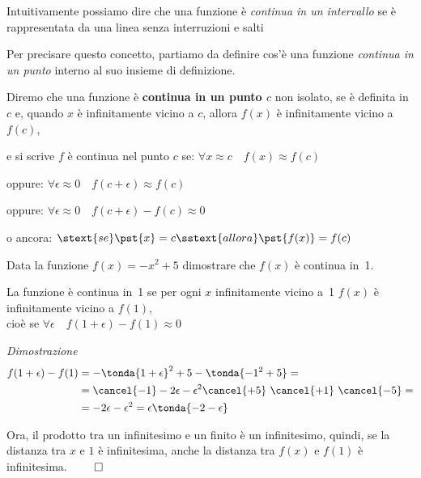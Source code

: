 Intuitivamente possiamo dire che una funzione è 
\emph{continua in un intervallo} 
se è rappresentata da una linea senza interruzioni e salti

Per precisare questo concetto, partiamo da definire cos'è una funzione 
\emph{continua in un punto} interno al suo insieme di definizione.

\begin{definizione}
Diremo che una funzione è \textbf{continua in un punto \(c\)} non isolato, 
se è definita in \(c\) e, 
quando \(x\) è infinitamente vicino a \(c\), 
allora \(f(x)\) è infinitamente vicino a \(f(c)\), 

\vspace{1em}
e si scrive \(f\) è continua nel punto \(c\) se: \hspace{12mm}
\(\forall x \approx c \quad f(x) \approx f(c)\)

\vspace{.5em}
oppure: \hspace{58mm}
\(\forall \epsilon \approx 0 \quad f(c + \epsilon) \approx f(c)\)

\vspace{.5em}
oppure: \hspace{58mm}
\(\forall \epsilon \approx 0 \quad f(c + \epsilon) - f(c) \approx 0\)

\vspace{.5em}
o ancora: \hspace{54mm}
\(\stext{se } \pst{x} = c \sstext{allora} \pst{f(x)} = f(c)\)
\end{definizione}

\begin{esempio}
Data la funzione \(f(x)=-x^2+5\) dimostrare che \(f(x)\) è continua in~1.

{
La funzione è continua in~1 se per ogni \(x\) infinitamente vicino a~1 
\(f(x)\) è infinitamente vicino a \(f(1)\), \\
cioè se \(\forall \epsilon \quad f(1 + \epsilon) - f(1) \approx 0\)

\emph{Dimostrazione}
\begin{align*}
f(1+\epsilon) - f(1) &= 
-\tonda{1+\epsilon}^2+5-\tonda{-1^2+5}=\\
&=\cancel{-1}-2\epsilon-\epsilon^2 \cancel{+5}~
  \cancel{+1}~\cancel{-5} = \\
&=-2\epsilon-\epsilon^2 = 
\epsilon \tonda{-2 - \epsilon}
\end{align*}
}{
\scalebox{1}{\contprimo}
}
Ora, il prodotto tra un infinitesimo e un finito è un infinitesimo, quindi, 
se la distanza tra \(x\) e \(1\) è infinitesima, anche la distanza tra 
\(f(x)\) e \(f(1)\) è infinitesima. \hfill \(\qed\) 
 
\end{esempio}

